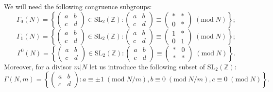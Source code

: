 \documentclass[11pt,a4paper]{amsart}
\theoremstyle{definition}
\newcommand{\SZ}{\mathbb{Z}}                    %
\begin{document}
We will need the following congruence subgroups:
\[  \Gamma_0(N) = \left\{ \begin{pmatrix} a & b \\ c & d \end{pmatrix} \in \mathrm{SL_2}(\SZ) : \begin{pmatrix} a & b \\ c & d \end{pmatrix} \equiv \begin{pmatrix} \ast & \ast \\ 0 & \ast \end{pmatrix} \;(\mathrm{mod}\;N) \right\}; \]
\[  \Gamma_1(N) = \left\{ \begin{pmatrix} a & b \\ c & d \end{pmatrix} \in \mathrm{SL_2}(\SZ) : \begin{pmatrix} a & b \\ c & d \end{pmatrix} \equiv \begin{pmatrix} 1 & \ast \\ 0 & 1 \end{pmatrix} \;(\mathrm{mod}\;N) \right\}; \]
\[  \Gamma^0(N) = \left\{ \begin{pmatrix} a & b \\ c & d \end{pmatrix} \in \mathrm{SL_2}(\SZ) : \begin{pmatrix} a & b \\ c & d \end{pmatrix} \equiv \begin{pmatrix} \ast & 0 \\ \ast & \ast \end{pmatrix} \;(\mathrm{mod}\;N) \right\}. \]
Moreover, for a divisor $m|N$ let us introduce the following subset of $\mathrm{SL_2}(\SZ)$:
\[  \Gamma(N,m) = \left\{ \begin{pmatrix} a & b \\ c & d \end{pmatrix}: a \equiv \pm 1 \;(\mathrm{mod}\;N/m), b \equiv 0 \;(\mathrm{mod}\;N/m), c \equiv 0 \;(\mathrm{mod}\;N) \right\}. \]
\end{document}

